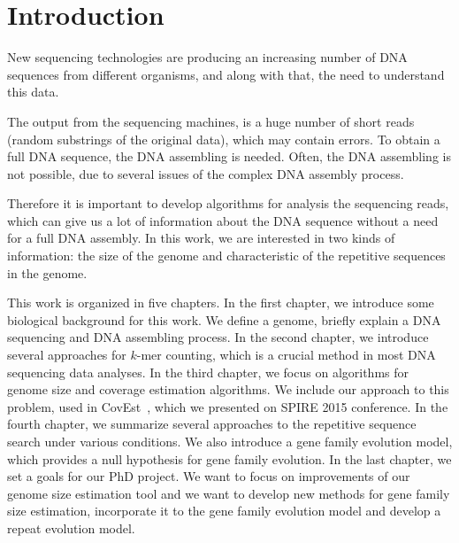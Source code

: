 \chapter*{Introduction}

New sequencing technologies are producing an increasing number of DNA sequences from different organisms, and along with that, the need to understand this data.

The output from the sequencing machines, is a huge number of short reads (random substrings of the original data), which may contain  errors. To obtain a full DNA sequence, the DNA assembling is needed. Often, the DNA assembling is not possible, due to several issues of the complex DNA assembly process.

Therefore it is important to develop algorithms for analysis the sequencing reads, which can give us a lot of information about the DNA sequence without a need for a full DNA assembly.
In this work, we are interested in two kinds of information: the size of the genome and characteristic of the repetitive sequences in the genome.

This work is organized in five chapters.
In the first chapter, we introduce some biological background for this work. We define a genome, briefly explain a DNA sequencing and DNA assembling process.
In the second chapter, we introduce several approaches for $k$-mer counting, which is a crucial method in most DNA sequencing data analyses.
In the third chapter, we focus on algorithms for genome size and coverage estimation algorithms. We include our approach to this problem, used in CovEst~\cite{covest}, which we presented on SPIRE 2015 conference.
In the fourth chapter, we summarize several approaches to the repetitive sequence search under various conditions. We also introduce a gene family evolution model, which provides a null hypothesis for gene family evolution.
In the last chapter, we set a goals for our PhD project. We want to focus on improvements of our genome size estimation tool and we want to develop new methods for gene family size estimation, incorporate it to the gene family evolution model and develop a repeat evolution model.
